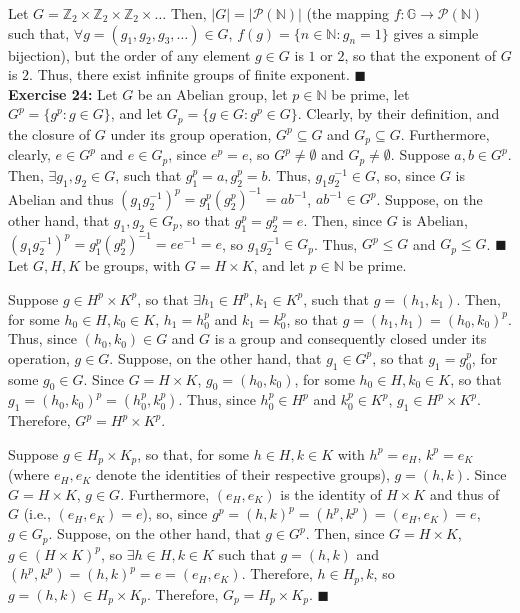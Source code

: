 \documentclass{article}%
\begin{document}
Let $G = \mathbb{Z}_2 \times \mathbb{Z}_2 \times \mathbb{Z}_2 \times \ldots$
Then, $|G| = |\mathcal{P}(\mathbb{N})|$ (the mapping $f: \mathbb{G}
\rightarrow \mathcal{P}(\mathbb{N})$ such that, $\forall g = (g_1,g_2,g_3,
\ldots) \in G$, $f(g) = \{n \in \mathbb{N}: g_n = 1\}$ gives a simple
bijection), but the order of any element $g \in G$ is $1$ or $2$, so that the
exponent of $G$ is $2$. Thus, there exist infinite groups of finite exponent.
\qquad $\blacksquare$ \\

\textbf{Exercise 24:} Let $G$ be an Abelian group, let $p \in \mathbb{N}$ be
prime, let $G^p = \{g^p : g \in G\}$, and let $G_p = \{g \in G : g^p \in G\}$.
Clearly, by their definition, and the closure of $G$ under its group operation,
$G^p \subseteq G$ and $G_p \subseteq G$. Furthermore, clearly, $e \in G^p$ and
$e \in G_p$, since $e^p = e$, so $G^p \neq \emptyset$ and $G_p \neq \emptyset$.
Suppose $a, b \in G^p$. Then, $\exists g_1, g_2 \in G$, such that $g_1^p = a,
g_2^p = b$. Thus, $g_1g_2^{-1} \in G$, so, since $G$ is Abelian and thus
$\left(g_1g_2^{-1}\right)^p = g_1^p \left(g_2^p\right)^{-1} = ab^{-1}$,
$ab^{-1} \in G^p$. Suppose, on the other hand, that  $g_1, g_2 \in G_p$, so
that $g_1^p = g_2^p = e$. Then, since $G$ is Abelian, $\left(g_1 g_2^{-1}
\right)^p = g_1^p \left(g_2^p\right)^{-1} = e e^{-1} = e$, so $g_1 g_2^{-1}
\in G_p$. Thus, $G^p \leq G$ and $G_p \leq G$. \qquad $\blacksquare$\\

Let $G, H, K$ be groups, with $G = H \times K$, and let $p \in \mathbb{N}$ be
prime.

Suppose $g \in H^p \times K^p$, so that $\exists h_1 \in H^p, k_1 \in K^p$,
such that $g = (h_1,k_1)$. Then, for some $h_0 \in H, k_0 \in K$, $h_1 =
h_0^p$ and $k_1 = k_0^p$, so that $g = (h_1,h_1) = (h_0,k_0)^p$. Thus,
since $(h_0, k_0) \in G$ and $G$ is a group and consequently closed under its
operation, $g \in G$. Suppose, on the other hand, that $g_1 \in G^p$, so that
$g_1 = g_0^p$, for some $g_0 \in G$. Since $G = H \times K$, $g_0 = (h_0,
k_0)$, for some $h_0 \in H,k_0 \in K$, so that $g_1 = (h_0,k_0)^p = (h_0^p,
k_0^p)$. Thus, since $h_0^p \in H^p$ and $k_0^p \in K^p$, $g_1 \in H^p \times
K^p$. Therefore, $G^p = H^p \times K^p$.

Suppose $g \in H_p \times K_p$, so that, for some $h \in H, k \in K$ with $h^p
 = e_H$, $k^p = e_K$ (where $e_H, e_K$ denote the identities of their
respective groups), $g = (h,k)$. Since $G = H \times K$, $g \in G$.
Furthermore, $(e_H,e_K)$ is the identity of $H \times K$ and thus of $G$ (i.e.,
$(e_H,e_K) = e$), so, since $g^p = (h,k)^p = (h^p,k^p) = (e_H,e_K) = e$, $g \in
G_p$. Suppose, on the other hand, that $g \in G^p$. Then, since $G = H \times
K$, $g \in \left(H \times K\right)^p$, so $\exists h \in H, k \in K$ such that
$g = (h,k)$ and $(h^p,k^p) = (h,k)^p = e = (e_H,e_K)$. Therefore, $h \in H_p,
k$, so $g = (h,k) \in H_p \times K_p$. Therefore, $G_p = H_p \times K_p$.
\qquad $\blacksquare$ \\
\end{document}
